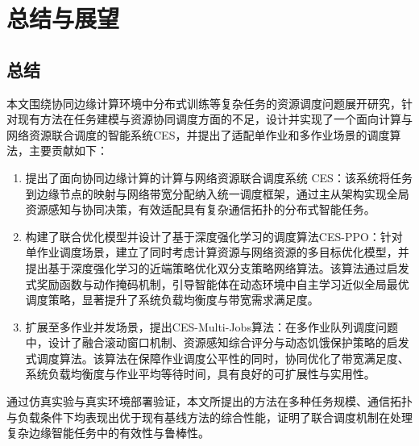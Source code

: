\chapter{总结与展望}
\section*{总结}
本文围绕协同边缘计算环境中分布式训练等复杂任务的资源调度问题展开研究，针对现有方法在任务建模与资源协同调度方面的不足，设计并实现了一个面向计算与网络资源联合调度的智能系统CES，并提出了适配单作业和多作业场景的调度算法，主要贡献如下：

\begin{enumerate}[topsep = 0 pt, itemsep= 0 pt, parsep=0pt, partopsep=0pt, leftmargin=0pt, itemindent=48pt, labelsep=0pt, listparindent=24pt, label=（\arabic*）]
    \item 提出了面向协同边缘计算的计算与网络资源联合调度系统 CES：该系统将任务到边缘节点的映射与网络带宽分配纳入统一调度框架，通过主从架构实现全局资源感知与协同决策，有效适配具有复杂通信拓扑的分布式智能任务。

   \item 构建了联合优化模型并设计了基于深度强化学习的调度算法CES-PPO：针对单作业调度场景，建立了同时考虑计算资源与网络资源的多目标优化模型，并提出基于深度强化学习的近端策略优化双分支策略网络算法。该算法通过启发式奖励函数与动作掩码机制，引导智能体在动态环境中自主学习近似全局最优调度策略，显著提升了系统负载均衡度与带宽需求满足度。
   
   \item 扩展至多作业并发场景，提出CES-Multi-Jobs算法：在多作业队列调度问题中，设计了融合滚动窗口机制、资源感知综合评分与动态饥饿保护策略的启发式调度算法。该算法在保障作业调度公平性的同时，协同优化了带宽满足度、系统负载均衡度与作业平均等待时间，具有良好的可扩展性与实用性。
\end{enumerate}

通过仿真实验与真实环境部署验证，本文所提出的方法在多种任务规模、通信拓扑与负载条件下均表现出优于现有基线方法的综合性能，证明了联合调度机制在处理复杂边缘智能任务中的有效性与鲁棒性。

